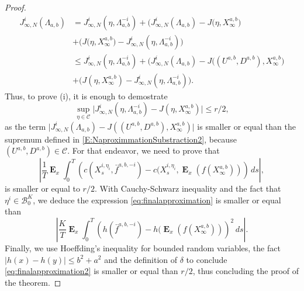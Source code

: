 \documentclass{article}
\newcommand\E{\operatorname{\mathbf{E}}}
\begin{document}
\begin{proof}
\begin{align}
J_{\infty,N}^{i}( \Lambda_{a,b})&=  J_{\infty,N}^{i}(\eta,\Lambda^{-i}_{a,b})+\big(J_{\infty,N}^{i}(\Lambda_{a,b})-J(\eta,X^{a,b}_{\infty}\big) \nonumber
\\& +\big(J(\eta,X^{a,b}_{\infty}\big)-J_{\infty,N}^{i}(\eta,\Lambda^{-i}_{a,b}) \big)\nonumber \\
                &\leq J_{\infty,N}^i(\eta,\Lambda^{-i}_{a,b})+\big(J_{\infty,N}^{i}(\Lambda_{a,b})-J((U^{a,b},D^{a,b}),X^{a,b}_{\infty}\big)\nonumber\\&+\big(J(\eta,X^{a,b}_{\infty} )-J_{\infty,N}^{i}(\eta,\Lambda^{-i}_{a,b}) \big).  \nonumber
\end{align}
%
Thus, to prove (\rm{i}), it is enough to demostrate 
 \begin{equation}\label{E:NaproximmationSubstraction2}
\sup_{\eta\in\mathcal{C}}\vert  J_{\infty,N}^{i}(\eta, \Lambda^{-i}_{a,b})-J(\eta, X^{a,b}_{\infty})\vert  \leq r/2,
\end{equation}
as the term $\vert J_{\infty,N}^{i} (\Lambda_{a,b})- J((U^{a,b},D^{a,b}),X^{a,b}_{\infty}) \vert$ is smaller or equal than the supremum defined in \eqref{E:NaproximmationSubstraction2}, because $(U^{a,b},D^{a,b}) \in \mathcal{C}$. For that endeavor, we need to prove that
\begin{equation}\label{eq:finalapproximation}
\left|\frac1T\E_x\int_0^T\left(c(X^{i,\eta_i}_s,\bar f^{a,b,-i})-c(X^{i,\eta_i}_s,\E_x(f(X^{a,b}_{\infty}))\right)\,ds\right|,
\end{equation}
is smaller or equal to $r/2$.
With Cauchy-Schwarz inequality and the fact that $\eta^i \in \mathcal{B}_0^K$, we deduce the expression \eqref{eq:finalapproximation} is smaller or equal than 
\begin{equation}\label{eq:finalapproximation2}
\left|\frac{K}{T}\E_x\int_0^T\left(h(\bar f^{a,b,-i})-h(\E_x(f(X^{a,b}_{\infty}))\right)^2\,ds\right|.
\end{equation}
Finally, we use Hoeffding's inequality for bounded random variables, the fact $\vert h(x)-h(y)\vert \leq b^2+a^2$ and the definition of $\delta$ to conclude \eqref{eq:finalapproximation2} is smaller or equal than $r/2$, thus concluding the proof of the theorem.

\end{proof}

%
\end{document}
